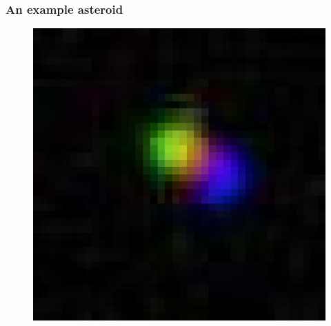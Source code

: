 \documentclass{beamer}
\begin{document}
{
    \begin{frame}[plain] \end{frame}
}

\begin{frame}
    \frametitle{An example asteroid}
    \begin{figure}
        \centering
        \includegraphics[height=0.8\paperheight]{18364_large.jpg}
    \end{figure}
\end{frame}
\end{document}
